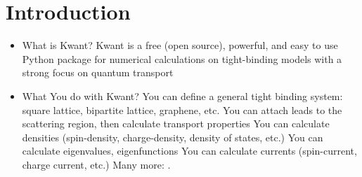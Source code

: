 \documentclass[12pt]{article}
\numberwithin{equation}{section}
\begin{document}
\newpage

\section*{Introduction}
\begin{itemize}
    \item What is Kwant?
    \subitem Kwant is a free (open source), powerful, and easy to use Python package for numerical calculations on tight-binding models with a strong focus on quantum transport \cite{kwantpage,kwant-paper}
\end{itemize}

\newpage
\begin{itemize}
    \item What You do with Kwant?
        \subitem You can define a general tight binding system: square lattice, bipartite lattice, graphene, etc.
        \subitem You can attach leads to the scattering region, then calculate transport properties
        \subitem You can calculate densities (spin-density, charge-density, density of states, etc.)
        \subitem You can calculate eigenvalues, eigenfunctions
        \subitem You can calculate currents (spin-current, charge current, etc.)
        \subitem Many more: \cite{kwantdoc}.
\end{itemize}

\newpage
\end{document}
